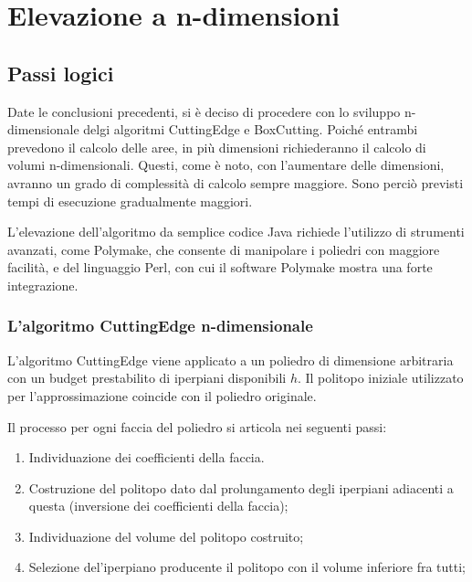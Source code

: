 \chapter{Elevazione a n-dimensioni}

\section{Passi logici}
Date le conclusioni precedenti, si è deciso di procedere con lo sviluppo n-dimensionale
delgi algoritmi CuttingEdge e BoxCutting.
Poiché entrambi prevedono il calcolo delle aree, in più dimensioni richiederanno il 
calcolo di volumi n-dimensionali. 
Questi, come è noto, con l'aumentare delle dimensioni, avranno un grado di complessità
di calcolo sempre maggiore. Sono perciò previsti tempi di esecuzione gradualmente maggiori.

L'elevazione dell'algoritmo da semplice codice Java richiede l'utilizzo di strumenti 
avanzati, come Polymake, che consente di manipolare i poliedri con maggiore facilità, 
e del linguaggio Perl, con cui il software Polymake mostra una forte integrazione.

\subsection{L'algoritmo CuttingEdge n-dimensionale}
L'algoritmo CuttingEdge viene applicato a un poliedro di dimensione arbitraria 
con un budget prestabilito di iperpiani disponibili $h$. 
Il politopo iniziale utilizzato per l'approssimazione coincide con il poliedro originale.

Il processo per ogni faccia del poliedro si articola nei seguenti passi:

\begin{enumerate} 
    
    \item Individuazione dei coefficienti della faccia.
    
    \item Costruzione del politopo dato dal prolungamento degli iperpiani adiacenti
    a questa (inversione dei coefficienti della faccia);

    \item Individuazione del volume del politopo costruito;
    
    \item Selezione del'iperpiano producente il politopo con il volume inferiore fra
    tutti;

\end{enumerate}

